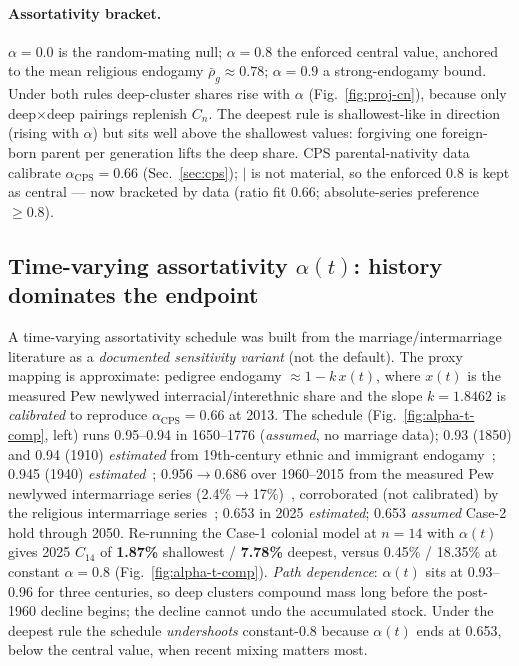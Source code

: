\documentclass[11pt,a4paper]{article}
\begin{document}
\paragraph{Assortativity bracket.} $\alpha=0.0$ is the random-mating
null; $\alpha=0.8$ the enforced central value, anchored to the mean
religious endogamy $\bar\rho_g\approx0.78$; $\alpha=0.9$ a
strong-endogamy bound.  Under both rules deep-cluster shares rise with
$\alpha$ (Fig.~\ref{fig:proj-cn}), because only deep$\times$deep
pairings replenish $C_n$.  The deepest rule is shallowest-like in direction
(rising with $\alpha$) but sits well above the shallowest values: forgiving
one foreign-born parent per generation lifts the deep share.  CPS
parental-nativity data calibrate
$\alpha_{\mathrm{CPS}}=0.66$ (Sec.~\ref{sec:cps});
$|$ is not material, so the enforced 0.8 is kept as
central --- now bracketed by data (ratio fit 0.66; absolute-series
preference $\ge 0.8$).

\subsection{Time-varying assortativity $\alpha(t)$: history dominates the endpoint}
A time-varying assortativity schedule was built from the
marriage/intermarriage literature as a \emph{documented sensitivity
variant} (not the default).  The proxy mapping is approximate: pedigree
endogamy $\approx 1-k\,x(t)$, where $x(t)$ is the measured Pew
newlywed interracial/interethnic share and the slope $k=1.8462$ is
\emph{calibrated} to reproduce $\alpha_{\mathrm{CPS}}=0.66$ at 2013.
The schedule (Fig.~\ref{fig:alpha-t-comp}, left) runs 0.95--0.94 in
1650--1776 (\emph{assumed}, no marriage data); 0.93 (1850) and 0.94
(1910) \emph{estimated} from 19th-century ethnic and immigrant
endogamy~\cite{alba-golden-1986,pagnini-morgan-1990,draschler-1921,spoerlein-2014,logan-shin-2012};
0.945 (1940) \emph{estimated}~\cite{alba-1983}; 0.956$\to$0.686 over
1960--2015 from the measured Pew newlywed intermarriage series
(2.4\%$\to$17\%)~\cite{pew-intermarriage-2023,livingston-brown-2017},
corroborated (not calibrated) by the religious intermarriage
series~\cite{pew-interfaith-2015}; 0.653 in 2025 \emph{estimated};
0.653 \emph{assumed} Case-2 hold through 2050.  Re-running the Case-1
colonial model at $n=14$ with $\alpha(t)$ gives 2025 $C_{14}$ of
\textbf{1.87\%} shallowest / \textbf{7.78\%} deepest, versus 0.45\% /
18.35\% at constant $\alpha=0.8$ (Fig.~\ref{fig:alpha-t-comp}).
\emph{Path dependence}: $\alpha(t)$ sits at 0.93--0.96 for three
centuries, so deep clusters compound mass long before the post-1960
decline begins; the decline cannot undo the accumulated stock.  Under
the deepest rule the schedule \emph{undershoots} constant-0.8 because
$\alpha(t)$ ends at 0.653, below the central value, when recent mixing
matters most.
\end{document}
